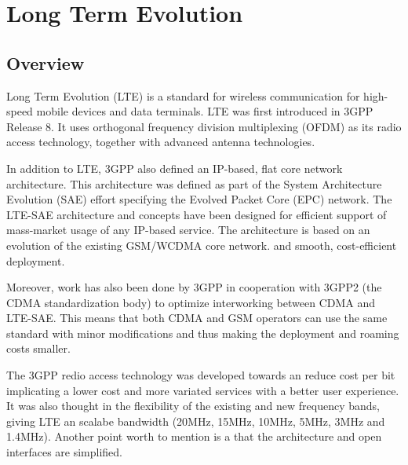 
\section{Long Term Evolution} %
\label{let:lte}

\subsection{Overview}

Long Term Evolution (LTE) is a standard for wireless communication for
high-speed mobile devices and data terminals. LTE was first introduced in 3GPP
Release 8. It uses orthogonal frequency division multiplexing (OFDM) as its
radio access technology, together with advanced antenna technologies.

In addition to LTE, 3GPP also defined an IP-based, flat core network
architecture. This architecture was defined as part of the System Architecture
Evolution (SAE) effort specifying the Evolved Packet Core (EPC) network. The
LTE-SAE architecture and concepts have been designed for efficient support of
mass-market usage of any IP-based service. The architecture is based on an
evolution of the existing GSM/WCDMA core network.%
and smooth, cost-efficient deployment.

Moreover, work has also been done by 3GPP in cooperation with 3GPP2 (the CDMA
standardization body) to optimize interworking between CDMA and LTE-SAE. This means
that both CDMA and GSM operators can use the same standard with minor modifications
and thus making the deployment and roaming costs smaller.

The 3GPP redio access technology was developed towards an reduce cost per bit
implicating a lower cost and more variated services with a better user
experience. It was also thought in the flexibility of the existing and new
frequency  bands, giving LTE an scalabe bandwidth (20MHz, 15MHz, 10MHz, 5MHz,
3MHz and 1.4MHz). Another point worth to mention is a that the architecture and
open interfaces are simplified.


%

